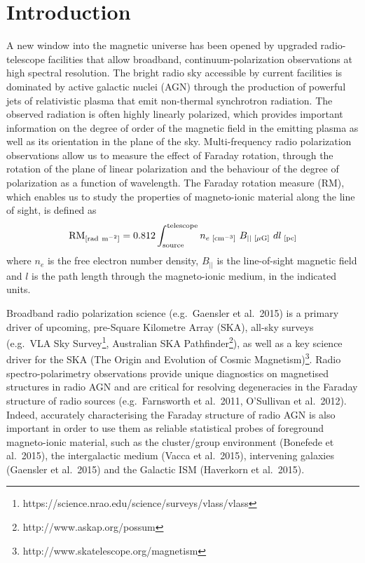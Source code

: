 \documentclass{mnras}
\begin{document}
\section{Introduction}
\label{introduction}
A new window into the magnetic universe has been opened by upgraded radio-telescope facilities that allow broadband, continuum-polarization observations at high spectral resolution. The bright radio sky accessible by current facilities is dominated by active galactic nuclei (AGN) through the production of powerful jets of relativistic plasma that emit non-thermal synchrotron radiation. The observed radiation is often highly linearly polarized, which provides important information on the degree of order of the magnetic field in the emitting plasma as well as its orientation in the plane of the sky. Multi-frequency radio polarization observations allow us to measure the effect of Faraday rotation, through the rotation of the plane of linear polarization and the behaviour of the degree of polarization as a function of wavelength. The Faraday rotation measure (RM), which enables us to study the properties of magneto-ionic material along the line of sight, is defined as  
\begin{equation}
{\rm RM}_{[{\rm rad~m}^{-2}]} = 0.812 \int_{\rm source}^{\rm telescope} n_{e\,\,[{\rm cm}^{-3}]} \,\, B_{||\,\,[{\rm \mu G}]} \,\, dl_{\,\,[\rm{pc}]} 
\label{rmeqn}
\end{equation}
where $n_e$ is the free electron number density, $B_{||}$ is the line-of-sight magnetic field and $l$ is the path length through the magneto-ionic medium, in the indicated units.

Broadband radio polarization science (e.g.~Gaensler et al.~2015) is a primary driver of upcoming, pre-Square Kilometre Array (SKA), all-sky surveys (e.g.~VLA Sky Survey\footnote{https://science.nrao.edu/science/surveys/vlass/vlass}, Australian SKA Pathfinder\footnote{http://www.askap.org/possum}), as well as a key science driver for the SKA (The Origin and Evolution of Cosmic Magnetism)\footnote{http://www.skatelescope.org/magnetism}. 
Radio spectro-polarimetry observations provide unique diagnostics on magnetised structures in radio AGN and are critical for resolving degeneracies in the Faraday structure of radio sources (e.g.~Farnsworth et al.~2011, O'Sullivan et al.~2012). Indeed, accurately characterising the Faraday structure of radio AGN is also important in order to use them as reliable statistical probes of foreground magneto-ionic material, such as the cluster/group environment (Bonefede et al.~2015), the intergalactic medium (Vacca et al.~2015), intervening galaxies (Gaensler et al.~2015) and the Galactic ISM (Haverkorn et al.~2015). 
\end{document}
